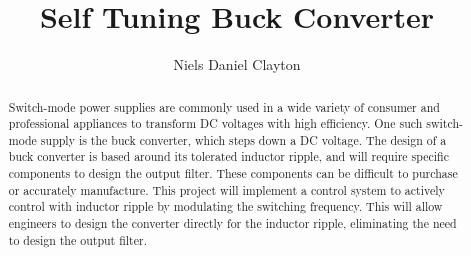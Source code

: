 \documentclass[11pt, a4paper, oneside]{report}
\title{Self Tuning Buck Converter}
\author{Niels Daniel Clayton}
\date{}
\begin{document}
\frontmatter


\begin{abstract}

	Switch-mode power supplies are commonly used in a wide variety of consumer and professional appliances to transform DC voltages with high efficiency. One such switch-mode supply is the buck converter, which steps down a DC voltage. The design of a buck converter is based around its tolerated inductor ripple, and will require specific components to design the output filter. These components can be difficult to purchase or accurately manufacture. This project will implement a control system to actively control with inductor ripple by modulating the switching frequency. This will allow engineers to design the converter directly for the inductor ripple, eliminating the need to design the output filter.

\end{abstract}


\maketitle

% 

\tableofcontents


\mainmatter










\backmatter



%


\end{document}
